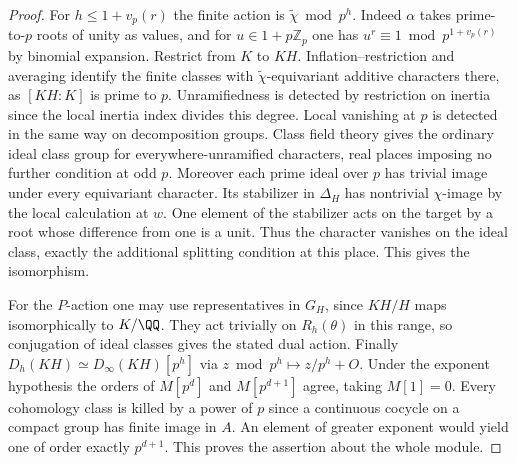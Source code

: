 \documentclass[a4paper,11pt]{article}
\theoremstyle{definition}
\theoremstyle{remark}
\newcommand{\ZZ}{\mathbb Z}\newcommand{\ord}{\operatorname{ord}}
\numberwithin{equation}{section}
\begin{document}
\begin{proof}
For \(h\le1+v_p(r)\) the finite action is
\(\widetilde\chi\bmod p^h\). Indeed \(\alpha\) takes
prime-to-\(p\) roots of unity as values, and for
\(u\in1+p\ZZ_p\) one has \(u^r\equiv1\bmod p^{1+v_p(r)}\)
by binomial expansion. Restrict from \(K\) to \(KH\).
Inflation--restriction and averaging identify the finite classes
with \(\widetilde\chi\)-equivariant additive characters there,
as \([KH:K]\) is prime to \(p\). Unramifiedness is detected by
restriction on inertia since the local inertia index divides
this degree. Local vanishing at \(p\) is detected in the same
way on decomposition groups. Class field theory gives the
ordinary ideal class group for everywhere-unramified characters,
real places imposing no further condition at odd \(p\).
Moreover each prime ideal over \(p\) has trivial image under
every equivariant character. Its stabilizer in \(\Delta_H\)
has nontrivial \(\chi\)-image by the local calculation at \(w\).
One element of the stabilizer acts on the target by a root whose
difference from one is a unit. Thus the character vanishes on
the ideal class, exactly the additional splitting condition at
this place. This gives the isomorphism.

For the \(P\)-action one may use representatives in \(G_H\),
since \(KH/H\) maps isomorphically to \(K/\QQ\). They act
trivially on \(R_h(\theta)\) in this range, so conjugation of
ideal classes gives the stated dual action. Finally
\(D_h(KH)\simeq D_\infty(KH)[p^h]\) via
\(z\bmod p^h\mapsto z/p^h+O\). Under the exponent hypothesis
the orders of \(M[p^d]\) and \(M[p^{d+1}]\) agree, taking
\(M[1]=0\). Every cohomology class is killed by a power of
\(p\) since a continuous cocycle on a compact group has finite
image in \(A\). An element of greater exponent would yield
one of order exactly \(p^{d+1}\). This proves the assertion
about the whole module.
\end{proof}
\end{document}
